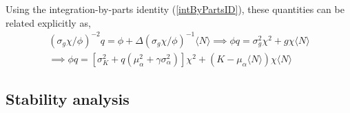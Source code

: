 \documentclass[10pt]{article}
\begin{document}
Using the integration-by-parts identity (\ref{intByPartsID}), these quantities can be related explicitly as,
\begin{gather}
	\left(
		\sigma_g\chi/\phi
	\right)^{-2}
	q
	=
	\phi
	+
	\Delta
	\left(
		\sigma_g\chi/\phi
	\right)^{-1}
	\langle N\rangle
	\implies
	\phi
	q
	=
	\sigma_g^2\chi^2
	+
	g\chi
	\langle N\rangle
	\\
	\implies
	\phi
	q
	=
	[\sigma_K^2 + q(\mu_\alpha^2 + \gamma \sigma_\alpha^2)]\chi^2
	+
	(K - \mu_\alpha \langle N\rangle)\chi\langle N\rangle
\end{gather}

\subsection{Stability analysis}
\end{document}
